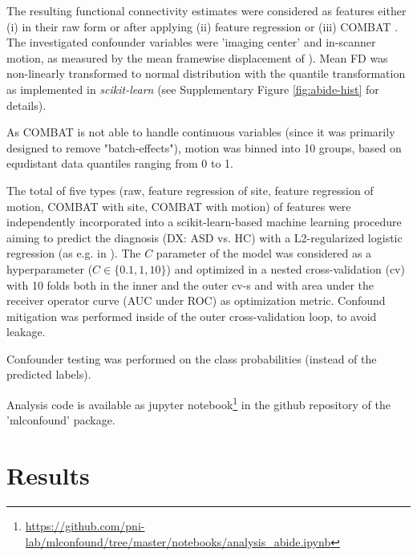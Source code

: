 \documentclass{article}
\begin{document}
The resulting functional connectivity estimates were considered as features either (i) in their raw form or after applying (ii) feature regression \citep{rao2017predictive} or (iii) COMBAT \citep{johnson2007adjusting, fortin2018harmonization}.
The investigated confounder variables were 'imaging center' and in-scanner motion, as measured by the mean framewise displacement of \cite{power2014methods}).
Mean FD was non-linearly transformed to normal distribution with the quantile transformation \citep{beasley2009rank} as implemented in \emph{scikit-learn} \citep{pedregosa2011scikit} (see Supplementary Figure \ref{fig:abide-hist} for details).

As COMBAT is not able to handle continuous variables (since it was primarily designed to remove "batch-effects"), motion was binned into 10 groups, based on equdistant data quantiles ranging from 0 to 1.

The total of five types (raw, feature regression of site, feature regression of motion, COMBAT with site, COMBAT with motion) of features were independently incorporated into a scikit-learn-based \citep{pedregosa2011scikit} machine learning procedure aiming to predict the diagnosis (DX: ASD vs. HC) with a L2-regularized logistic regression (as e.g. in \citep{dadi2019benchmarking}). The $C$ parameter of the model was considered as a hyperparameter ($C \in \{0.1, 1, 10\}$) and optimized in a nested cross-validation (cv) with 10 folds both in the inner and the outer cv-s and with area under the receiver operator curve (AUC under ROC) as optimization metric. Confound mitigation was performed inside of the outer cross-validation loop, to avoid leakage.

Confounder testing was performed on the class probabilities (instead of the predicted labels).

Analysis code is available as jupyter notebook\footnote{\href{https://github.com/pni-lab/mlconfound/tree/master/notebooks/analysis\_abide.ipynb}{https://github.com/pni-lab/mlconfound/tree/master/notebooks/analysis\_abide.ipynb}} in the github repository of the 'mlconfound' package.

\section{Results}
\end{document}
